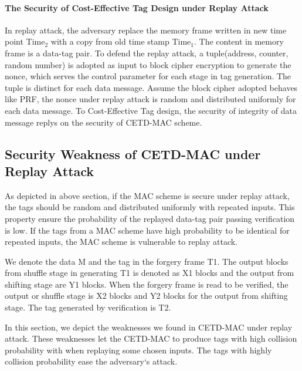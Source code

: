 \documentclass{article}
\begin{document}
\paragraph{The Security of Cost-Effective Tag Design under Replay Attack}
In replay attack, the adversary replace the memory frame written in new time
point Time$_2$ with a copy from old time stamp Time$_1$. The content in memory
frame is a data-tag pair. To defend the replay attack, a tuple(address, counter,
random number) is adopted as input to block cipher encryption to generate the
nonce, which serves the control parameter for each stage in tag generation. The
tuple is distinct for each data message. Assume the block cipher adopted behaves
like PRF, the nonce under replay attack is random and distributed
uniformly for each data message. To Cost-Effective Tag design, the security of integrity of data message replys on the
security of CETD-MAC scheme.

\subsection{Security Weakness of CETD-MAC under Replay Attack}
As depicted in above section, if the MAC scheme is secure under replay attack,
the tags should be random and distributed uniformly with repeated inputs. This
property ensure the probability of the replayed data-tag pair passing verification
is low. If the tags from a MAC scheme have high probability to be identical for
repeated inputs, the MAC scheme is vulnerable to replay attack.

We denote the data M and the tag in the forgery frame T1. The output blocks from shuffle stage in generating T1 is denoted as X1 blocks and the output from shifting stage are Y1 blocks. When the forgery frame is read to be verified, the output or shuffle stage is X2 blocks and Y2 blocks for the output from shifting stage. The tag generated by verification is T2.  

In this section, we depict the weaknesses we found in CETD-MAC under replay attack. These weaknesses let the CETD-MAC to produce tags with high collision probability with when replaying some chosen inputs. The tags with highly collision probability ease the adversary`s attack. 
\end{document}
